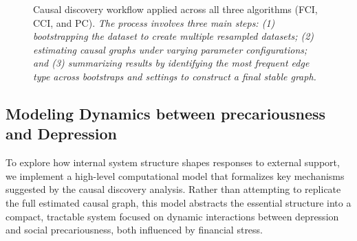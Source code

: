 \documentclass[
]{article}
\begin{document}
\begin{figure}


\caption{\label{fig-workflow}Causal discovery workflow applied across
all three algorithms (FCI, CCI, and PC). \emph{The process involves
three main steps: (1) bootstrapping the dataset to create multiple
resampled datasets; (2) estimating causal graphs under varying parameter
configurations; and (3) summarizing results by identifying the most
frequent edge type across bootstraps and settings to construct a final
stable graph.}}

\end{figure}%

\subsection{Modeling Dynamics between precariousness and
Depression}\label{modeling-dynamics-between-precariousness-and-depression}

To explore how internal system structure shapes responses to external
support, we implement a high-level computational model that formalizes
key mechanisms suggested by the causal discovery analysis. Rather than
attempting to replicate the full estimated causal graph, this model
abstracts the essential structure into a compact, tractable system
focused on dynamic interactions between depression and social
precariousness, both influenced by financial stress.
\end{document}
